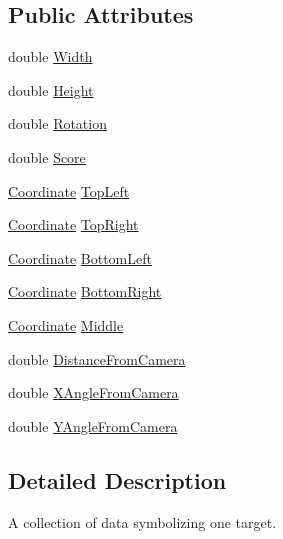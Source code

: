 \subsection*{\-Public \-Attributes}
\begin{DoxyCompactItemize}
\item 
double \hyperlink{struct_target_utils_1_1_target_acc71a9dd1ebdcc7fb60df9beeaa85cba}{\-Width}
\item 
double \hyperlink{struct_target_utils_1_1_target_a8aed99c7df9c1f6081e28dfede4411e8}{\-Height}
\item 
double \hyperlink{struct_target_utils_1_1_target_a553c8eb8a24ac3af475d51c76b8f0323}{\-Rotation}
\item 
double \hyperlink{struct_target_utils_1_1_target_a8f4ceb84ffecf3bfbc320c8d8ffd5ba3}{\-Score}
\item 
\hyperlink{struct_target_utils_1_1_coordinate}{\-Coordinate} \hyperlink{struct_target_utils_1_1_target_ae507fa3ee02637705956a602a81f131a}{\-Top\-Left}
\item 
\hyperlink{struct_target_utils_1_1_coordinate}{\-Coordinate} \hyperlink{struct_target_utils_1_1_target_a6a78ecb7c2ff3f5633afbe4c76e8d939}{\-Top\-Right}
\item 
\hyperlink{struct_target_utils_1_1_coordinate}{\-Coordinate} \hyperlink{struct_target_utils_1_1_target_a367f0f8f95b3c40ba319cf55110c481d}{\-Bottom\-Left}
\item 
\hyperlink{struct_target_utils_1_1_coordinate}{\-Coordinate} \hyperlink{struct_target_utils_1_1_target_aaf8c42b6a6179d85d0a130b502aa37ec}{\-Bottom\-Right}
\item 
\hyperlink{struct_target_utils_1_1_coordinate}{\-Coordinate} \hyperlink{struct_target_utils_1_1_target_aab9c8f1c81c730da864cae8518303906}{\-Middle}
\item 
double \hyperlink{struct_target_utils_1_1_target_a07d88d70507a213b8353a0a1384e60e1}{\-Distance\-From\-Camera}
\item 
double \hyperlink{struct_target_utils_1_1_target_a7c9329af80c304ba48e5752d12562773}{\-X\-Angle\-From\-Camera}
\item 
double \hyperlink{struct_target_utils_1_1_target_a9492565f66be784c272076bde727223d}{\-Y\-Angle\-From\-Camera}
\end{DoxyCompactItemize}


\subsection{\-Detailed \-Description}
\-A collection of data symbolizing one target. 

